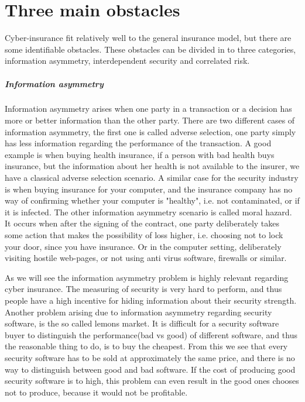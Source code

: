 \section{Three main obstacles}
Cyber-insurance fit relatively well to the general insurance model, but there are some identifiable obstacles. These obstacles can be divided in to three categories, information asymmetry, interdependent security and  correlated risk. 
\subparagraph{Information asymmetry}
Information asymmetry arises when one party in a transaction or a decision has more or better
 information than the other party. There are two different cases of information asymmetry, the first
  one is called adverse selection, one party simply has less information regarding the performance of
   the transaction. A good example is when buying health insurance, if a person with bad health buys
    insurance, but the information about her health is not available to the insurer, we have a
     classical adverse selection scenario. A similar case for the security industry is when buying
      insurance for your computer, and the insurance company has no way of confirming whether your
       computer is "healthy", i.e. not contaminated, or if it is infected. 
The other information asymmetry scenario is called moral hazard. It occurs when after the signing of
 the contract, one party deliberately takes some action that makes the possibility of loss higher,
  i.e. choosing not to lock your door, since you have insurance. Or in the computer setting,
   deliberately visiting hostile web-pages, or not using anti virus software, firewalls or similar.
    \cite{solutiontoinfoasym}
    
As we will see the information asymmetry problem is highly relevant regarding cyber insurance.
 The measuring of security is very hard to perform, and thus people have a 
 high incentive for hiding information about their security strength. 
 Another problem arising due to information asymmetry regarding security software, 
 is the so called lemons market. It is difficult for a security software buyer to distinguish the
  performance(bad vs good) of different software, and thus the reasonable thing to do, is to buy the
   cheapest. From this we see that every security software has to be sold at approximately the same
    price, and there is no way to distinguish between good and bad software. If the cost of producing
     good security software is to high, this problem can even result in the good ones chooses not to
      produce, because it would not be profitable. 
      
